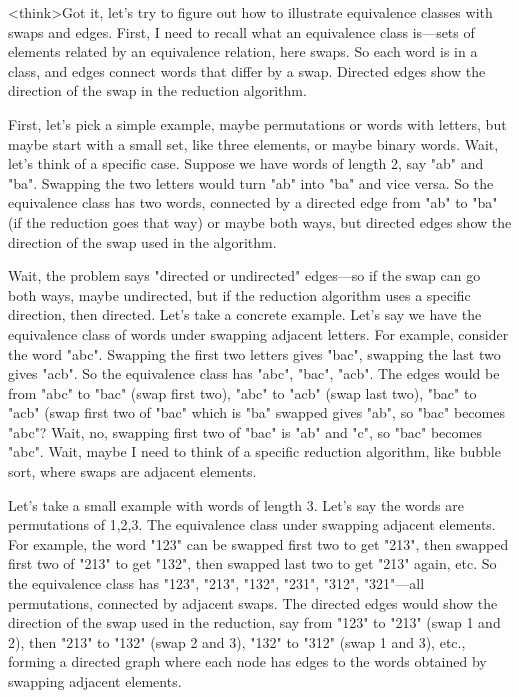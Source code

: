 <think>Got it, let's try to figure out how to illustrate equivalence classes with swaps and edges. First, I need to recall what an equivalence class is—sets of elements related by an equivalence relation, here swaps. So each word is in a class, and edges connect words that differ by a swap. Directed edges show the direction of the swap in the reduction algorithm.

First, let's pick a simple example, maybe permutations or words with letters, but maybe start with a small set, like three elements, or maybe binary words. Wait, let's think of a specific case. Suppose we have words of length 2, say "ab" and "ba". Swapping the two letters would turn "ab" into "ba" and vice versa. So the equivalence class has two words, connected by a directed edge from "ab" to "ba" (if the reduction goes that way) or maybe both ways, but directed edges show the direction of the swap used in the algorithm.

Wait, the problem says "directed or undirected" edges—so if the swap can go both ways, maybe undirected, but if the reduction algorithm uses a specific direction, then directed. Let's take a concrete example. Let's say we have the equivalence class of words under swapping adjacent letters. For example, consider the word "abc". Swapping the first two letters gives "bac", swapping the last two gives "acb". So the equivalence class has "abc", "bac", "acb". The edges would be from "abc" to "bac" (swap first two), "abc" to "acb" (swap last two), "bac" to "acb" (swap first two of "bac" which is "ba" swapped gives "ab", so "bac" becomes "abc"? Wait, no, swapping first two of "bac" is "ab" and "c", so "bac" becomes "abc". Wait, maybe I need to think of a specific reduction algorithm, like bubble sort, where swaps are adjacent elements.

Let's take a small example with words of length 3. Let's say the words are permutations of {1,2,3}. The equivalence class under swapping adjacent elements. For example, the word "123" can be swapped first two to get "213", then swapped first two of "213" to get "132", then swapped last two to get "213" again, etc. So the equivalence class has "123", "213", "132", "231", "312", "321"—all permutations, connected by adjacent swaps. The directed edges would show the direction of the swap used in the reduction, say from "123" to "213" (swap 1 and 2), then "213" to "132" (swap 2 and 3), "132" to "312" (swap 1 and 3), etc., forming a directed graph where each node has edges to the words obtained by swapping adjacent elements.

